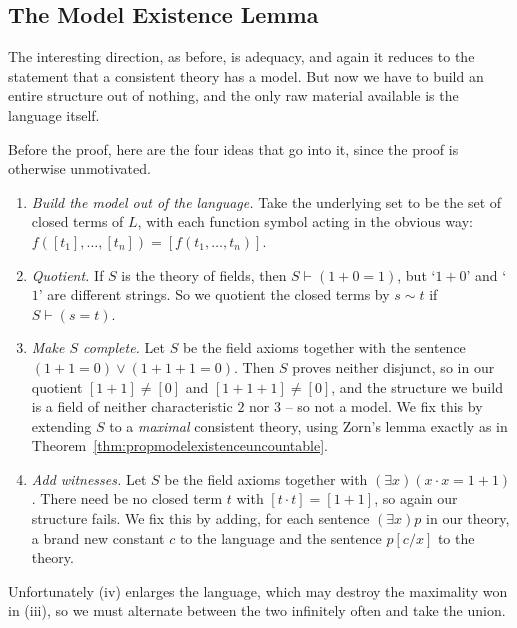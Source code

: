 \documentclass[a4paper]{scrartcl}
\begin{document}
\subsection{The Model Existence Lemma}

The interesting direction, as before, is adequacy, and again it reduces to the statement that a consistent theory has a model. But now we have to build an entire structure out of nothing, and the only raw material available is the language itself.

Before the proof, here are the four ideas that go into it, since the proof is otherwise unmotivated.

\begin{enumerate}[label=(\roman*)]
  \item \emph{Build the model out of the language.} Take the underlying set to be the set of closed terms of $L$, with each function symbol acting in the obvious way: $f([t_1], \dots, [t_n]) = [f(t_1, \dots, t_n)]$.
  \item \emph{Quotient.} If $S$ is the theory of fields, then $S \vdash (1 + 0 = 1)$, but `$1+0$' and `$1$' are different strings. So we quotient the closed terms by $s \sim t$ if $S \vdash (s = t)$.
  \item \emph{Make $S$ complete.} Let $S$ be the field axioms together with the sentence $(1+1 = 0) \lor (1+1+1 = 0)$. Then $S$ proves neither disjunct, so in our quotient $[1+1] \neq [0]$ and $[1+1+1] \neq [0]$, and the structure we build is a field of neither characteristic $2$ nor $3$ -- so not a model. We fix this by extending $S$ to a \emph{maximal} consistent theory, using Zorn's lemma exactly as in Theorem~\ref{thm:propmodelexistenceuncountable}.
  \item \emph{Add witnesses.} Let $S$ be the field axioms together with $(\exists x)(x \cdot x = 1+1)$. There need be no closed term $t$ with $[t \cdot t] = [1+1]$, so again our structure fails. We fix this by adding, for each sentence $(\exists x)p$ in our theory, a brand new constant $c$ to the language and the sentence $p[c/x]$ to the theory.
\end{enumerate}
Unfortunately (iv) enlarges the language, which may destroy the maximality won in (iii), so we must alternate between the two infinitely often and take the union.
\end{document}
